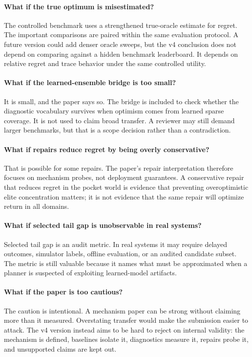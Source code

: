 \paragraph{What if the true optimum is misestimated?}
The controlled benchmark uses a strengthened true-oracle estimate for regret.
The important comparisons are paired within the same evaluation protocol. A
future version could add denser oracle sweeps, but the v4 conclusion does not
depend on comparing against a hidden benchmark leaderboard. It depends on
relative regret and trace behavior under the same controlled utility.

\paragraph{What if the learned-ensemble bridge is too small?}
It is small, and the paper says so. The bridge is included to check whether
the diagnostic vocabulary survives when optimism comes from learned sparse
coverage. It is not used to claim broad transfer. A reviewer may still demand
larger benchmarks, but that is a scope decision rather than a contradiction.

\paragraph{What if repairs reduce regret by being overly conservative?}
That is possible for some repairs. The paper's repair interpretation therefore
focuses on mechanism probes, not deployment guarantees. A conservative repair
that reduces regret in the pocket world is evidence that preventing
overoptimistic elite concentration matters; it is not evidence that the same
repair will optimize return in all domains.

\paragraph{What if selected tail gap is unobservable in real systems?}
Selected tail gap is an audit metric. In real systems it may require delayed
outcomes, simulator labels, offline evaluation, or an audited candidate subset.
The metric is still valuable because it names what must be approximated when a
planner is suspected of exploiting learned-model artifacts.

\paragraph{What if the paper is too cautious?}
The caution is intentional. A mechanism paper can be strong without claiming
more than it measured. Overstating transfer would make the submission easier
to attack. The v4 version instead aims to be hard to reject on internal
validity: the mechanism is defined, baselines isolate it, diagnostics measure
it, repairs probe it, and unsupported claims are kept out.

